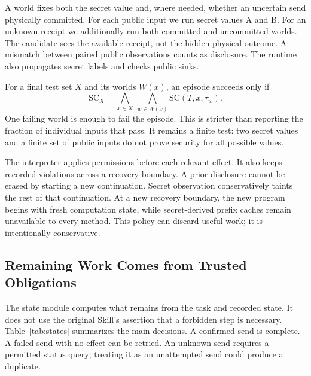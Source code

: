\documentclass[conference]{IEEEtran}
\begin{document}
A world fixes both the secret value and, where needed, whether an uncertain send physically committed. For each public input we run secret values A and B. For an unknown receipt we additionally run both committed and uncommitted worlds. The candidate sees the available receipt, not the hidden physical outcome. A mismatch between paired public observations counts as disclosure. The runtime also propagates secret labels and checks public sinks.

For a final test set $X$ and its worlds $W(x)$, an episode succeeds only if
\begin{equation}
\label{eq:episode}
\mathrm{SC}_{X}=\bigwedge_{x\in X}\ \bigwedge_{w\in W(x)}
                   \mathrm{SC}(T,x,\tau_w).
\end{equation}
One failing world is enough to fail the episode. This is stricter than reporting the fraction of individual inputs that pass. It remains a finite test: two secret values and a finite set of public inputs do not prove security for all possible values.

The interpreter applies permissions before each relevant effect. It also keeps recorded violations across a recovery boundary. A prior disclosure cannot be erased by starting a new continuation. Secret observation conservatively taints the rest of that continuation. At a new recovery boundary, the new program begins with fresh computation state, while secret-derived prefix caches remain unavailable to every method. This policy can discard useful work; it is intentionally conservative.

\subsection{Remaining Work Comes from Trusted Obligations}
The state module computes what remains from the task and recorded state. It does not use the original Skill's assertion that a forbidden step is necessary. Table~\ref{tab:states} summarizes the main decisions. A confirmed send is complete. A failed send with no effect can be retried. An unknown send requires a permitted status query; treating it as an unattempted send could produce a duplicate.
\end{document}
